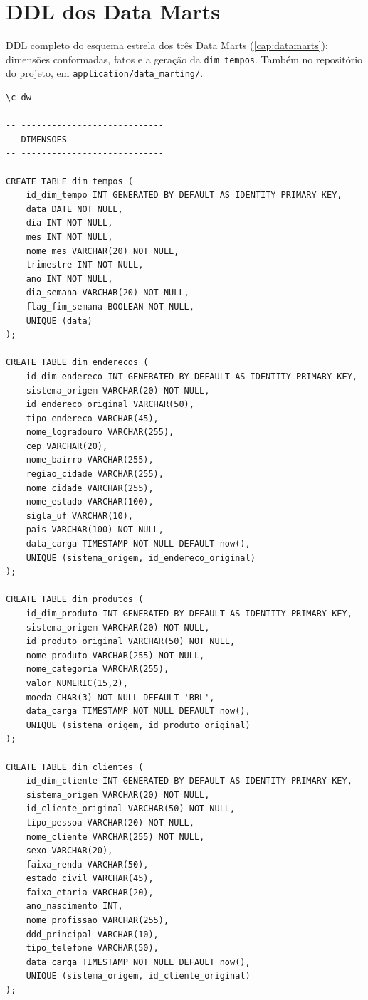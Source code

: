 \chapter{DDL dos Data Marts}
\label{apend:ddl-marts}

DDL completo do esquema estrela dos três Data Marts (\autoref{cap:datamarts}): dimensões conformadas, fatos e a geração da \texttt{dim\_tempos}. Também no repositório do projeto, em \texttt{application/data\_marting/}.

{\footnotesize
\begin{verbatim}
\c dw

-- ----------------------------
-- DIMENSOES
-- ----------------------------

CREATE TABLE dim_tempos (
    id_dim_tempo INT GENERATED BY DEFAULT AS IDENTITY PRIMARY KEY,
    data DATE NOT NULL,
    dia INT NOT NULL,
    mes INT NOT NULL,
    nome_mes VARCHAR(20) NOT NULL,
    trimestre INT NOT NULL,
    ano INT NOT NULL,
    dia_semana VARCHAR(20) NOT NULL,
    flag_fim_semana BOOLEAN NOT NULL,
    UNIQUE (data)
);

CREATE TABLE dim_enderecos (
    id_dim_endereco INT GENERATED BY DEFAULT AS IDENTITY PRIMARY KEY,
    sistema_origem VARCHAR(20) NOT NULL,
    id_endereco_original VARCHAR(50),
    tipo_endereco VARCHAR(45),
    nome_logradouro VARCHAR(255),
    cep VARCHAR(20),
    nome_bairro VARCHAR(255),
    regiao_cidade VARCHAR(255),
    nome_cidade VARCHAR(255),
    nome_estado VARCHAR(100),
    sigla_uf VARCHAR(10),
    pais VARCHAR(100) NOT NULL,
    data_carga TIMESTAMP NOT NULL DEFAULT now(),
    UNIQUE (sistema_origem, id_endereco_original)
);

CREATE TABLE dim_produtos (
    id_dim_produto INT GENERATED BY DEFAULT AS IDENTITY PRIMARY KEY,
    sistema_origem VARCHAR(20) NOT NULL,
    id_produto_original VARCHAR(50) NOT NULL,
    nome_produto VARCHAR(255) NOT NULL,
    nome_categoria VARCHAR(255),
    valor NUMERIC(15,2),
    moeda CHAR(3) NOT NULL DEFAULT 'BRL',
    data_carga TIMESTAMP NOT NULL DEFAULT now(),
    UNIQUE (sistema_origem, id_produto_original)
);

CREATE TABLE dim_clientes (
    id_dim_cliente INT GENERATED BY DEFAULT AS IDENTITY PRIMARY KEY,
    sistema_origem VARCHAR(20) NOT NULL,
    id_cliente_original VARCHAR(50) NOT NULL,
    tipo_pessoa VARCHAR(20) NOT NULL,
    nome_cliente VARCHAR(255) NOT NULL,
    sexo VARCHAR(20),
    faixa_renda VARCHAR(50),
    estado_civil VARCHAR(45),
    faixa_etaria VARCHAR(20),
    ano_nascimento INT,
    nome_profissao VARCHAR(255),
    ddd_principal VARCHAR(10),
    tipo_telefone VARCHAR(50),
    data_carga TIMESTAMP NOT NULL DEFAULT now(),
    UNIQUE (sistema_origem, id_cliente_original)
);


\end{verbatim}}
